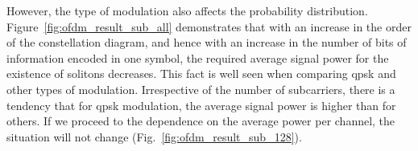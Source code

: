 However, the type of modulation also affects the probability distribution. Figure~\ref{fig:ofdm_result_sub_all} demonstrates that with an increase in the order of the constellation diagram, and hence with an increase in the number of bits of information encoded in one symbol, the required average signal power for the existence of solitons decreases. This fact is well seen when comparing \acrshort{qpsk} and other types of modulation. Irrespective of the number of subcarriers, there is a tendency that for \acrshort{qpsk} modulation, the average signal power is higher than for others. If we proceed to the dependence on the average power per channel, the situation will not change (Fig.~\ref{fig:ofdm_result_sub_128}).

\begin{figure}[htpb]
    \begin{minipage}[h]{0.47\linewidth}
    \end{minipage}
    \hfill
    \begin{minipage}[h]{0.47\linewidth}
        \center{
}
\end{minipage}
\end{figure}
